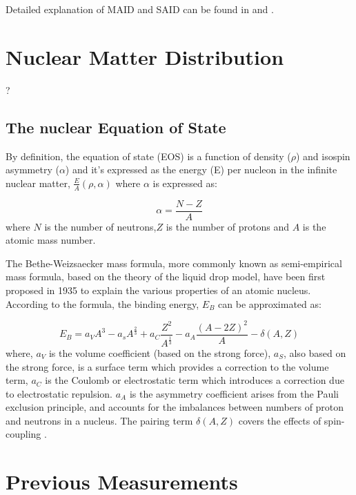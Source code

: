 \indent Detailed explanation of MAID and SAID can be found in \cite{maid} and \cite{said, arndt}.

\section{Nuclear Matter Distribution}

\indent ?

\subsection{The nuclear Equation of State}

\indent By definition, the equation of state (EOS) is a function of density ($\rho$) and isospin asymmetry ($\alpha$) and it's expressed as the energy (E) per nucleon in the infinite nuclear matter, $\frac{E}{A} (\rho,\alpha)$ where $\alpha$ is expressed as:

\begin{equation}
\alpha=\frac{N-Z}{A}
\end{equation}
where $N$ is the number of neutrons,$Z$ is the number of protons and $A$ is the atomic mass number.

\indent The Bethe-Weizsaecker mass formula, more commonly known as semi-empirical mass formula, based on the theory of the liquid drop model, have been first proposed in 1935 to explain the various properties of an atomic nucleus. According to the formula, the binding energy, $E_{B}$ can be approximated as:

\begin{equation}
E_{B}=a_{V}A^{3}-a_{s}A^{\frac{2}{3}}+a_{C}\frac{Z^{2}}{A^{\frac{1}{3}}}-a_{A}\frac{(A-2Z)^{2}}{A}-\delta(A,Z)
\end{equation}
where, $a_{V}$ is the volume coefficient (based on the strong force), $a_{S}$, also based on the strong force, is a surface term which provides a correction to the volume term, $a_{C}$ is the Coulomb or electrostatic term which introduces a correction due to electrostatic repulsion. $a_{A}$ is the asymmetry coefficient arises from the Pauli exclusion principle, and accounts for the imbalances between numbers of proton and neutrons in a nucleus. The pairing term $\delta(A,Z)$ covers the effects of spin-coupling \cite{bertulani}.

\indent

\section{Previous Measurements}

